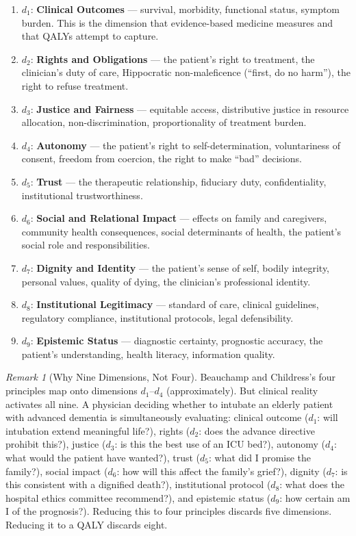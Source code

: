 \documentclass[12pt]{article}
\theoremstyle{definition}
\theoremstyle{remark}
\newtheorem{remark}[theorem]{Remark}
\begin{document}
\begin{enumerate}
    \item $d_1$: \textbf{Clinical Outcomes} --- survival, morbidity, functional status, symptom burden.  This is the dimension that evidence-based medicine measures and that QALYs attempt to capture.
    \item $d_2$: \textbf{Rights and Obligations} --- the patient's right to treatment, the clinician's duty of care, Hippocratic non-maleficence (``first, do no harm''), the right to refuse treatment.
    \item $d_3$: \textbf{Justice and Fairness} --- equitable access, distributive justice in resource allocation, non-discrimination, proportionality of treatment burden.
    \item $d_4$: \textbf{Autonomy} --- the patient's right to self-determination, voluntariness of consent, freedom from coercion, the right to make ``bad'' decisions.
    \item $d_5$: \textbf{Trust} --- the therapeutic relationship, fiduciary duty, confidentiality, institutional trustworthiness.
    \item $d_6$: \textbf{Social and Relational Impact} --- effects on family and caregivers, community health consequences, social determinants of health, the patient's social role and responsibilities.
    \item $d_7$: \textbf{Dignity and Identity} --- the patient's sense of self, bodily integrity, personal values, quality of dying, the clinician's professional identity.
    \item $d_8$: \textbf{Institutional Legitimacy} --- standard of care, clinical guidelines, regulatory compliance, institutional protocols, legal defensibility.
    \item $d_9$: \textbf{Epistemic Status} --- diagnostic certainty, prognostic accuracy, the patient's understanding, health literacy, information quality.
\end{enumerate}

\begin{remark}[Why Nine Dimensions, Not Four]
Beauchamp and Childress's four principles map onto dimensions $d_1$--$d_4$ (approximately).  But clinical reality activates all nine.  A physician deciding whether to intubate an elderly patient with advanced dementia is simultaneously evaluating: clinical outcome ($d_1$: will intubation extend meaningful life?), rights ($d_2$: does the advance directive prohibit this?), justice ($d_3$: is this the best use of an ICU bed?), autonomy ($d_4$: what would the patient have wanted?), trust ($d_5$: what did I promise the family?), social impact ($d_6$: how will this affect the family's grief?), dignity ($d_7$: is this consistent with a dignified death?), institutional protocol ($d_8$: what does the hospital ethics committee recommend?), and epistemic status ($d_9$: how certain am I of the prognosis?).  Reducing this to four principles discards five dimensions.  Reducing it to a QALY discards eight.
\end{remark}
\end{document}
